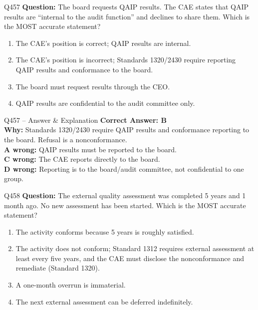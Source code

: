 \documentclass[aspectratio=169,10pt]{beamer}
\begin{document}
	\begin{frame}[t]{Q457}
		\small
		\textbf{Question:} The board requests QAIP results. The CAE states that QAIP results are ``internal to the audit function'' and declines to share them. Which is the MOST accurate statement?
		\begin{enumerate}[label=\Alph*.,itemsep=1pt,topsep=2pt]
			\item The CAE's position is correct; QAIP results are internal.
			\item The CAE's position is incorrect; Standards 1320/2430 require reporting QAIP results and conformance to the board.
			\item The board must request results through the CEO.
			\item QAIP results are confidential to the audit committee only.
		\end{enumerate}
	\end{frame}
	
	\begin{frame}[t]{Q457 -- Answer \& Explanation}
		\small
		\textbf{Correct Answer: B} \\[4pt]
		\textbf{Why:} Standards 1320/2430 require QAIP results and conformance reporting to the board. Refusal is a nonconformance. \\[4pt]
		\textbf{A wrong:} QAIP results must be reported to the board. \\[2pt]
		\textbf{C wrong:} The CAE reports directly to the board. \\[2pt]
		\textbf{D wrong:} Reporting is to the board/audit committee, not confidential to one group.
	\end{frame}
	
	\begin{frame}[t]{Q458}
		\small
		\textbf{Question:} The external quality assessment was completed 5 years and 1 month ago. No new assessment has been started. Which is the MOST accurate statement?
		\begin{enumerate}[label=\Alph*.,itemsep=1pt,topsep=2pt]
			\item The activity conforms because 5 years is roughly satisfied.
			\item The activity does not conform; Standard 1312 requires external assessment at least every five years, and the CAE must disclose the nonconformance and remediate (Standard 1320).
			\item A one-month overrun is immaterial.
			\item The next external assessment can be deferred indefinitely.
		\end{enumerate}
	\end{frame}
	
\end{document}
